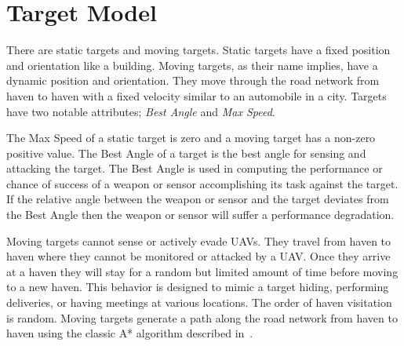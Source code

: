 \chapter{Target Model}
There are static targets and moving targets.  Static targets have a fixed position and orientation like a building.  Moving targets, as their name implies, have a dynamic position and orientation.  They move through the road network from haven to haven with a fixed velocity similar to an automobile in a city.  Targets have two notable attributes; \textit{Best Angle} and \textit{Max Speed}.

The Max Speed of a static target is zero and a moving target has a non-zero positive value.  The Best Angle of a target is the best angle for sensing and attacking the target.  The Best Angle is used in computing the performance or chance of success of a weapon or sensor accomplishing its task against the target.  If the relative angle between the weapon or sensor and the target deviates from the Best Angle then the weapon or sensor will suffer a performance degradation.  



Moving targets cannot sense or actively evade UAVs.  They travel from haven to haven where they cannot be monitored or attacked by a UAV.  Once they arrive at a haven they will stay for a random but limited amount of time before moving to a new haven.  This behavior is designed to mimic a target hiding, performing deliveries, or having meetings at various locations.  The order of haven visitation is random.  Moving targets generate a path along the road network from haven to haven using the classic A* algorithm described in~\cite{wiki:astar}.

